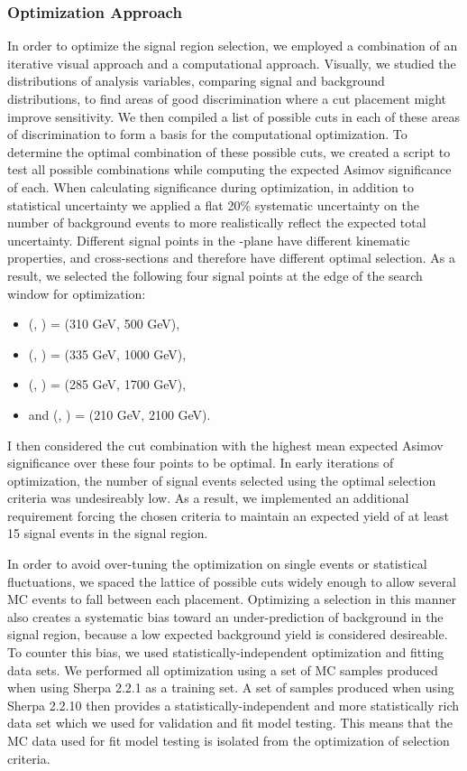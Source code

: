 \subsubsection{Optimization Approach}
In order to optimize the signal region selection, we employed a combination of an iterative visual approach and a computational approach. Visually, we studied the distributions of analysis variables, comparing signal and background distributions, to find areas of good discrimination where a cut placement might improve sensitivity. We then compiled a list of possible cuts in each of these areas of discrimination to form a basis for the computational optimization. To determine the optimal combination of these possible cuts, we created a script to test all possible combinations while computing the expected Asimov significance of each. When calculating significance during optimization, in addition to statistical uncertainty we applied a flat 20\% systematic uncertainty on the number of background events to more realistically reflect the expected total uncertainty. Different signal points in the \ms-\mZp plane have different kinematic properties, and cross-sections and therefore have different optimal selection. As a result, we selected the following four signal points at the edge of the search window for optimization:

\begin{itemize}
  \item (\ms, \mZp) = (310 GeV, 500 GeV),
  \item (\ms, \mZp) = (335 GeV, 1000 GeV),
  \item (\ms, \mZp) = (285 GeV, 1700 GeV),
  \item and (\ms, \mZp) = (210 GeV, 2100 GeV).
\end{itemize}

I then considered the cut combination with the highest mean expected Asimov significance over these four points to be optimal. In early iterations of optimization, the number of signal events selected using the optimal selection criteria was undesireably low. As a result, we implemented an additional requirement forcing the chosen criteria to maintain an expected yield of at least 15 signal events in the \merged signal region.

In order to avoid over-tuning the optimization on single events or statistical fluctuations, we spaced the lattice of possible cuts widely enough to allow several MC events to fall between each placement. Optimizing a selection in this manner also creates a systematic bias toward an under-prediction of background in the signal region, because a low expected background yield is considered desireable. To counter this bias, we used statistically-independent optimization and fitting data sets. We performed all optimization using a set of MC samples produced when using Sherpa 2.2.1 as a training set. A set of samples produced when using Sherpa 2.2.10 then provides a statistically-independent and more statistically rich data set which we used for validation and fit model testing. This means that the MC data used for fit model testing is isolated from the optimization of selection criteria.


